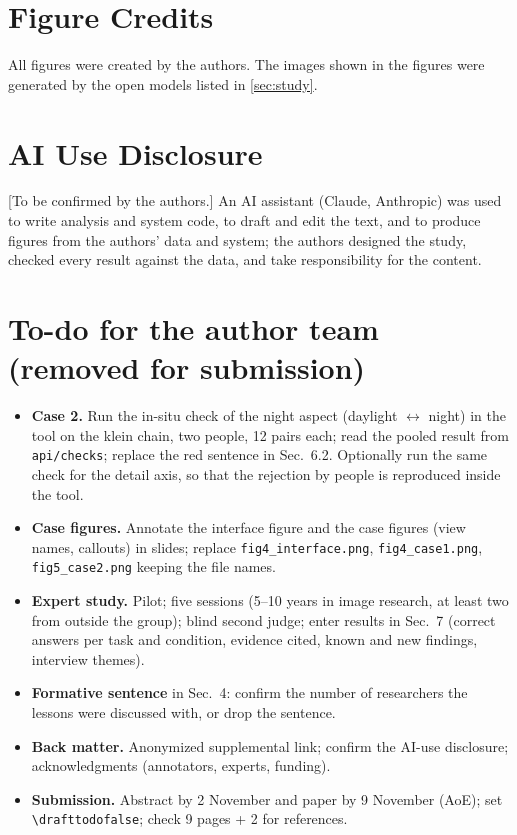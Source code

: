 \documentclass[review]{vgtc}                 %
\newcommand{\pending}[1]{\textcolor{red!70!black}{[#1]}}
\newif\ifdrafttodo \drafttodotrue
\begin{document}
\section*{Figure Credits}
\label{sec:figure_credits}
All figures were created by the authors. The images shown in the figures were generated by the open models listed in \cref{sec:study}.

\section*{AI Use Disclosure}
\pending{To be confirmed by the authors.} An AI assistant (Claude, Anthropic) was used to write analysis and system code, to draft and edit the text, and to produce figures from the authors' data and system; the authors designed the study, checked every result against the data, and take responsibility for the content.

\acknowledgments{\pending{Annotators; experts; funding.}}

%

%
%
%



\ifdrafttodo
\clearpage
\section*{To-do for the author team (removed for submission)}
\begin{itemize}\itemsep 2pt
\item \textbf{Case 2.} Run the in-situ check of the night aspect (daylight $\leftrightarrow$ night) in the tool on the klein chain, two people, 12 pairs each; read the pooled result from \texttt{api/checks}; replace the red sentence in Sec.~6.2. Optionally run the same check for the detail axis, so that the rejection by people is reproduced inside the tool.
\item \textbf{Case figures.} Annotate the interface figure and the case figures (view names, callouts) in slides; replace \texttt{fig4\_interface.png}, \texttt{fig4\_case1.png}, \texttt{fig5\_case2.png} keeping the file names.
\item \textbf{Expert study.} Pilot; five sessions (5--10 years in image research, at least two from outside the group); blind second judge; enter results in Sec.~7 (correct answers per task and condition, evidence cited, known and new findings, interview themes).
\item \textbf{Formative sentence} in Sec.~4: confirm the number of researchers the lessons were discussed with, or drop the sentence.
\item \textbf{Back matter.} Anonymized supplemental link; confirm the AI-use disclosure; acknowledgments (annotators, experts, funding).
\item \textbf{Submission.} Abstract by 2 November and paper by 9 November (AoE); set \verb|\drafttodofalse|; check 9 pages + 2 for references.
\end{itemize}
\fi
\end{document}
